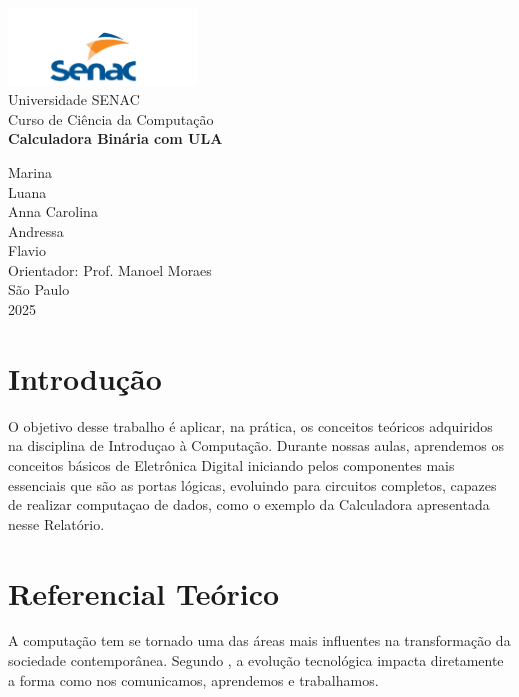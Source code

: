 \documentclass[
12pt,
openright,
oneside,
a4paper,
chapter=TITLE,
english,
brazil,
colorlinks=true,
linkcolor=blue,
citecolor=blue,
filecolor=magenta,
urlcolor=blue
]{abntex2}
\begin{document}
	
	\begin{capa}
		\begin{center}
			\includegraphics[width=5cm]{imagem/senaclogo.png} \\[1cm]
			{\large Universidade SENAC} \\
			{\large Curso de Ciência da Computação} \\
			\vfill
			{\bfseries\Large Calculadora Binária com ULA} \\
			\vfill
			
			Marina \\
			Luana \\
			Anna Carolina \\
            Andressa\\
            Flavio\\
			\vfill
			{\large Orientador: Prof. Manoel Moraes} \\
			\vfill
			São Paulo \\
			2025
		\end{center}
	\end{capa}
	
	\folhaderostocontent
	
	\cleardoublepage
	\tableofcontents
	
	\chapter{Introdução}
	O objetivo desse trabalho é aplicar, na prática, os conceitos teóricos adquiridos na disciplina de Introduçao à Computação. 
     Durante nossas aulas, aprendemos os conceitos básicos de Eletrônica Digital iniciando pelos componentes mais essenciais que são as portas lógicas, evoluindo para circuitos completos, capazes de realizar computaçao de dados, como o exemplo da Calculadora apresentada nesse Relatório.
	
	\chapter{Referencial Teórico}
	
	A computação tem se tornado uma das áreas mais influentes na transformação da sociedade contemporânea. Segundo , a evolução tecnológica impacta diretamente a forma como nos comunicamos, aprendemos e trabalhamos.
	
\end{document}
